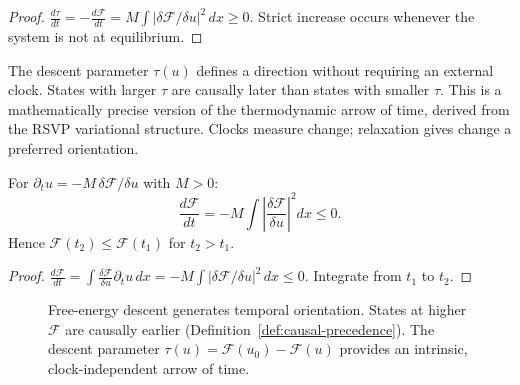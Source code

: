\begin{proof}
  $\frac{d\tau}{dt} = -\frac{d\mathcal{F}}{dt}
  = M\int|\delta\mathcal{F}/\delta u|^2\,dx \geq 0$.
  Strict increase occurs whenever the system is not at equilibrium.
\end{proof}

\begin{InterpBox}
  The descent parameter $\tau(u)$ defines a direction without
  requiring an external clock.
  States with larger $\tau$ are causally later than states with
  smaller $\tau$.
  This is a mathematically precise version of the thermodynamic
  arrow of time, derived from the RSVP variational structure.
  Clocks measure change; relaxation gives change a preferred
  orientation.
\end{InterpBox}

\begin{proposition}
  \label{prop:entropy-monotone}
  \statusproven{}
  For $\partial_t u = -M\,\delta\mathcal{F}/\delta u$ with $M > 0$:
  \[
    \frac{d\mathcal{F}}{dt}
    = -M\!\int\!\left|\frac{\delta\mathcal{F}}{\delta u}\right|^2 dx
    \leq 0.
  \]
  Hence $\mathcal{F}(t_2) \leq \mathcal{F}(t_1)$ for $t_2 > t_1$.
\end{proposition}

\begin{proof}
  $\frac{d\mathcal{F}}{dt}
  = \int\frac{\delta\mathcal{F}}{\delta u}\partial_t u\,dx
  = -M\int|\delta\mathcal{F}/\delta u|^2\,dx \leq 0$.
  Integrate from $t_1$ to $t_2$.
\end{proof}


\begin{figure}[ht]
\centering
{}
\caption{Free-energy descent generates temporal orientation.
         States at higher $\mathcal{F}$ are causally earlier
         (Definition~\ref{def:causal-precedence}).
         The descent parameter $\tau(u) = \mathcal{F}(u_0)-\mathcal{F}(u)$
         provides an intrinsic, clock-independent arrow of time.}
\label{fig:lyapunov-descent}
\end{figure}

